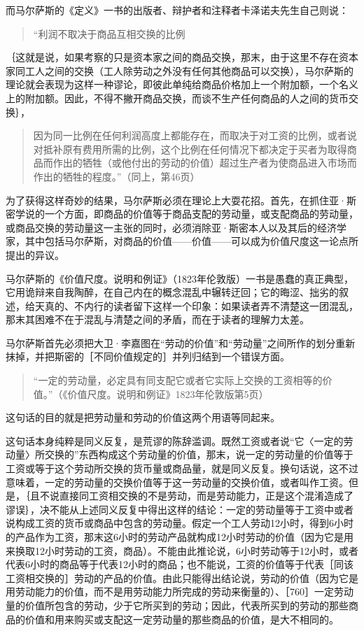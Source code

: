 而马尔萨斯的《定义》一书的出版者、辩护者和注释者卡泽诺夫先生自己则说：

\begin{quote}{“利润不取决于商品互相交换的比例}\end{quote}

｛这就是说，如果考察的只是资本家之间的商品交换，那末，由于这里不存在资本家同工人之间的交换（工人除劳动之外没有任何其他商品可以交换），马尔萨斯的理论就会表现为这样一种谬论，即彼此单纯给商品价格加上一个附加额，一个名义上的附加额。因此，不得不撇开商品交换，而谈不生产任何商品的人之间的货币交换｝，

\begin{quote}{因为同一比例在任何利润高度上都能存在，而取决于对工资的比例，或者说对抵补原有费用所需的比例，这个比例在任何情况下都决定于买者为取得商品而作出的牺牲（或他付出的劳动的价值）超过生产者为使商品进入市场而作出的牺牲的程度。”（同上，第46页）}\end{quote}

为了获得这样奇妙的结果，马尔萨斯必须在理论上大耍花招。首先，在抓住亚·斯密学说的一个方面，即商品的价值等于商品支配的劳动量，或支配商品的劳动量，或商品交换的劳动量这一主张的同时，必须消除亚·斯密本人以及其后的经济学家，其中包括马尔萨斯，对商品的价值——价值——可以成为价值尺度这一论点所提出的异议。

马尔萨斯的《价值尺度。说明和例证》（1823年伦敦版）一书是愚蠢的真正典型，它用诡辩来自我陶醉，在自己内在的概念混乱中辗转迂回；它的晦涩、拙劣的叙述，给天真的、不内行的读者留下这样一个印象：如果读者弄不清楚这一团混乱，那末其困难不在于混乱与清楚之间的矛盾，而在于读者的理解力太差。

马尔萨斯首先必须把大卫·李嘉图在“劳动的价值”和“劳动量”之间所作的划分重新抹掉，并把斯密的［不同价值规定的］并列归结到一个错误方面。

\begin{quote}{“一定的劳动量，必定具有同支配它或者它实际上交换的工资相等的价值。”（《价值尺度。说明和例证》1823年伦敦版第5页）}\end{quote}

这句话的目的就是把劳动量和劳动的价值这两个用语等同起来。

这句话本身纯粹是同义反复，是荒谬的陈辞滥调。既然工资或者说“它〈一定的劳动量〉所交换的”东西构成这个劳动量的价值，那末，说一定的劳动量的价值等于工资或等于这个劳动所交换的货币量或商品量，就是同义反复。换句话说，这不过意味着，一定的劳动量的交换价值等于这一劳动量的交换价值，或者叫作工资。但是，｛且不说直接同工资相交换的不是劳动，而是劳动能力，正是这个混淆造成了谬误｝，决不能从上述同义反复中得出这样的结论：一定的劳动量等于工资中或者说构成工资的货币或商品中包含的劳动量。假定一个工人劳动12小时，得到6小时的产品作为工资，那末这6小时的劳动产品就构成12小时劳动的价值（因为它是用来换取12小时劳动的工资，商品）。不能由此推论说，6小时劳动等于12小时，或者代表6小时的商品等于代表12小时的商品；也不能说，工资的价值等于代表［同该工资相交换的］劳动的产品的价值。由此只能得出结论说，劳动的价值（因为它是用劳动能力的价值，而不是用劳动能力所完成的劳动来衡量的）、［760］一定劳动量的价值所包含的劳动，少于它所买到的劳动；因此，代表所买到的劳动的那些商品的价值和用来购买或支配这一定劳动量的那些商品的价值，是大不相同的。


